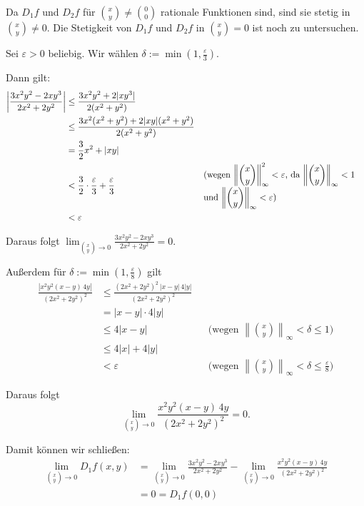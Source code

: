 \documentclass[a4paper,12pt]{article}
\begin{document}
\begin{enumerate}[label=\alph*)]
    Da $D_1 f$ und $D_2 f$ für $\binom{x}{y} \neq \binom{0}{0}$ rationale Funktionen sind, sind sie stetig in $\binom{x}{y} \neq 0$.
    Die Stetigkeit von $D_1 f$ und $D_2 f$ in $\binom{x}{y} = 0$ ist noch zu untersuchen.

    Sei $\varepsilon > 0$ beliebig. Wir wählen $\delta := \min\!\left(1, \tfrac{\varepsilon}{3}\right)$.

    Dann gilt:
    \begin{align*}
        \left|\frac{3x^2 y^2 - 2xy^3}{2x^2+2y^2}\right|
        &\leq \frac{3x^2 y^2 + 2|xy^3|}{2(x^2+y^2)} \\
        &\leq \frac{3x^2 (x^2+y^2) + 2|xy|(x^2+y^2)}{2(x^2+y^2)} \\
        &= \frac{3}{2} x^2 + |xy| \\
        &< \frac{3}{2} \cdot \frac{\varepsilon}{3} + \frac{\varepsilon}{3} && \text{\parbox{6cm}{\raggedright (wegen $\left\|\binom{x}{y}\right\|_\infty^2 < \varepsilon$, da $\left\|\binom{x}{y}\right\|_\infty < 1$ und $\left\|\binom{x}{y}\right\|_\infty < \varepsilon$)}} \\
        &< \varepsilon
    \end{align*}

    Daraus folgt $\displaystyle\lim_{\binom{x}{y} \to 0} \frac{3x^2 y^2 - 2xy^3}{2x^2+2y^2} = 0$.

    Außerdem für $\delta := \min\!\left(1, \tfrac{\varepsilon}{8}\right)$ gilt
    \begin{align*}
        \frac{|x^2 y^2 (x-y) \, 4y|}{(2x^2+2y^2)^2}
        &\leq \frac{(2x^2+2y^2)^2 \, |x-y| \, 4|y|}{(2x^2+2y^2)^2} \\
        &= |x-y| \cdot 4|y| \\
        &\leq 4|x-y| && \text{(wegen $\left\|\binom{x}{y}\right\|_\infty < \delta \leq 1$)} \\
        &\leq 4|x| + 4|y| \\
        &< \varepsilon && \text{(wegen $\left\|\binom{x}{y}\right\|_\infty < \delta \leq \tfrac{\varepsilon}{8}$)}
    \end{align*}

    Daraus folgt
    \[
        \lim_{\binom{x}{y} \to 0} \frac{x^2 y^2 (x-y) \, 4y}{(2x^2+2y^2)^2} = 0.
    \]

    Damit können wir schließen:
    \begin{align*}
        \lim_{\binom{x}{y} \to 0} D_1 f(x,y)
        &= \lim_{\binom{x}{y} \to 0} \frac{3x^2 y^2 - 2xy^3}{2x^2+2y^2}
         - \lim_{\binom{x}{y} \to 0} \frac{x^2 y^2 (x-y) \, 4y}{(2x^2+2y^2)^2} \\
        &= 0 = D_1 f(0,0)
    \end{align*}


\end{enumerate}
\end{document}
